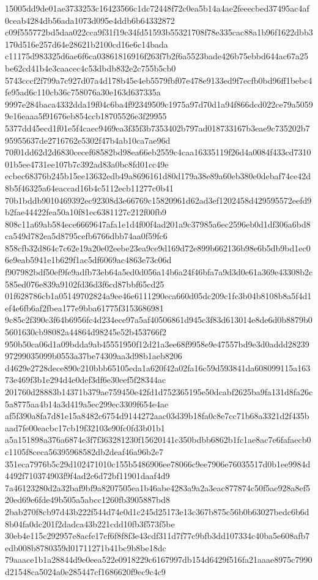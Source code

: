 \documentclass[11pt,a4paper]{article}
\begin{document}
{15005dd9de01ae3733253c16423566c1dc72448f72c0ea5b14a4ae2feeecbed37495ac4af0ceab4284db56ada1073d095e4ddb6b64332872
c09f555772bd5daa022cca9f31f19c34fd51593b55321708f78e335cac88a1b96f1622dbb3170d516e257d64e28621b2100cd16e6c14bada
c11175d983325d6ae6f6ca03861816916f263f7b2f6a5523bade426b75ebbd644ac67a25be62cd41b4e3caacec4c53dbdb832e2c755b5cb0
5743cccf2f799a7c927d07a4d178b45e4eb5579fbf07e478e9133ed9f7ecfb0bd96ff1bebc4fe95ad6c110cb36c758076a30e163d637335a
9997e284baca4332dda19f04c6ba4f92349509c1975a97d70d1a94f866dcd022ce79a50599e16eaaa5f91676eb854ccb18705526e3f29955
5377dd45ecd1f01e5f4caec9469ea3f35f3b7353402b797ad018733167b3eae9c735202b795955637de2716762e5302f47b4ab10ca7ae96d
70f01dd62d2d6830cecef68582bd98ea66eb2559c4caa16335119f26d4a0084f433cd731001b5ee4731ee107b7c392ad83a0bc8fd01cc49e
ecbec68376b245b15ee13632edb49a8696161d80d179a38e89a60eb380e0debaf74ce42d8b5f46325a64eaccad16b4c5112ecb11277c0b41
70b1bddb9010469392ec92308d3e66769c15820961d62ad3ef1202458d429595572eefd9b2fae44422fea50a10f81ec6381127c212f00fb9
808c11a69ab584ece6669647afa1e1d4f00f4ad201a9c37985a6ec2596eb0d1df306a6bd8ca549d782ea5d8795cefb6766dbb74aa0f59fc6
858cfb32d864c7c62e19a20e02eebe23ea9ce9d169d72e899b662136b98e6b5db9bd1ec06e9eab5941e1b629f1ac5df6069ac4863e73c06d
f907982bdf50ef9fe9adfb73eb64a5ed0d056a14b6a24f46bfa7a9d3d0e61a369e43308b2c585ed076e839a9102fd36d3f6cd87bbf65cd25
01f628786cb1a05149702824a9ee46e6111290eca660d05dc209c1fc3b04b8108b8a5f4d1ef4e6fb6af2fbea177e9bba61775f3153686981
9c85c2f390c3f64b6956fc4d234ece97a5af40506861d945c3f83d613014e8de6d0b8879b05601630cb98082a44864d98245e52b453766f2
950b50ca06d1a09bdda9ab45551950f12d21a3ee68f9958e9e47557bd9e3d0addd2823997299035099b0553a37be74309aa3d98b1aeb8206
d4629e2728dece890c210bbb65105eda1a620f42a02fa16c59d593841da608099115a16373e469f3b1e294d4e0def3df6e30eef5f28344ac
201760d28883b14371b379ae759450e42fd1d752365195e50dcabf2625ba9fa131d8fa26c5a8775aa4b14a3d419a5ec299ec3309f654e4ae
af5f390a8fa7d81e15a8482c6754d9144272aac03d39b18fa0c8e7cc71b68a3321d2f435baad7fe00eacbc17cb19f32103e90fc0fd3b01b1
a5a151898a376a6874e3f7f363281230f15620141c350bdbb6862b1fc1ae8ac7e6fafaecb0c1105f8ceca56395968582db2deaf46a96b2e7
351eca7976b5c29d102471010c155b5486906ee78066c9ee7906e76035517d0b1ee9984d4492f710374903f9f4ad2c6d72bf11901daaf4d9
7a46123280d2a32baf9bf9a8207505ea1b46abe4283a9a2a3eac877874c50f5ae928a8ef520ed69e6fde49b505a5abcc1260fb3905887bd8
2bab270f8cb97d43b222f544d74e0d1c245d25173e13c367b875c56b0b63027bedc6b6d8b04fa0dc201f2dadca43b221cdd10fb3f573f5be
30eb4e115c292957e8acfe17cf6f8f8f3e43cdf311d7f77c9bfb3dd107334c40ba5e608afb7edb008b8780359d01711271b41bc9b8be18dc
79aaace1b1a28844d9e0eea522e0918229c6167997db154d6429f516fa21aaae8975c7990d21548ca5024a0e285447cf1686620f9ec9c4c9
}
\end{document}
